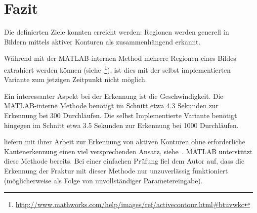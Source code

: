 \chapter{Fazit}
\label{chap:conclusion}

Die definierten Ziele konnten erreicht werden: Regionen werden generell in Bildern mittels aktiver Konturen als zusammenhängend erkannt.

Während mit der MATLAB-internen Method mehrere Regionen eines Bildes extrahiert werden können (siehe~\footnote{\url{http://www.mathworks.com/help/images/ref/activecontour.html\#btuvwkc}}), ist dies mit der selbst implementierten Variante zum jetzigen Zeitpunkt nicht möglich.

Ein interessanter Aspekt bei der Erkennung ist die Geschwindigkeit. Die MATLAB-interne Methode benötigt im Schnitt etwa 4.3 Sekunden zur Erkennung bei 300 Durchläufen. Die selbst Implementierte Variante benötigt hingegen im Schnitt etwa 3.5 Sekunden zur Erkennung bei 1000 Durchläufen.

\citeauthor*{Chan:2001:ACW:2318993.2320071} liefern mit ihrer Arbeit zur Erkennung von aktiven Konturen ohne erforderliche Kantenerkennung einen viel versprechenden Ansatz, siehe~\cite{Chan:2001:ACW:2318993.2320071}. MATLAB unterstützt diese Methode bereits. Bei einer einfachen Prüfung fiel dem Autor auf, dass die Erkennung der Fraktur mit dieser Methode nur unzuverlässig funktioniert (möglicherweise als Folge von unvollständiger Parametereingabe).
